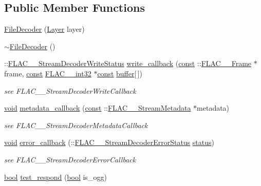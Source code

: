 \subsection*{Public Member Functions}
\begin{DoxyCompactItemize}
\item 
\hyperlink{class_file_decoder_af02f5afaac3171d70c7fc7ff48814525}{File\+Decoder} (\hyperlink{decoders_8c_a9a8118be7780e95363d631cbca7e7800}{Layer} layer)
\item 
\hyperlink{class_file_decoder_a9346b4780db3a0c08462a58651c34281}{$\sim$\+File\+Decoder} ()
\item 
\+::\hyperlink{group__flac__stream__decoder_ga73f67eb9e0ab57945afe038751bc62c8}{F\+L\+A\+C\+\_\+\+\_\+\+Stream\+Decoder\+Write\+Status} \hyperlink{class_file_decoder_a7ae15f00a3698dc421854bfd83cd51f4}{write\+\_\+callback} (\hyperlink{getopt1_8c_a2c212835823e3c54a8ab6d95c652660e}{const} \+::\hyperlink{struct_f_l_a_c_____frame}{F\+L\+A\+C\+\_\+\+\_\+\+Frame} $\ast$frame, \hyperlink{getopt1_8c_a2c212835823e3c54a8ab6d95c652660e}{const} \hyperlink{ordinals_8h_a33fd77bfe6d685541a0c034a75deccdc}{F\+L\+A\+C\+\_\+\+\_\+int32} $\ast$\hyperlink{getopt1_8c_a2c212835823e3c54a8ab6d95c652660e}{const} \hyperlink{structbuffer}{buffer}\mbox{[}$\,$\mbox{]})
\begin{DoxyCompactList}\small\item\em see F\+L\+A\+C\+\_\+\+\_\+\+Stream\+Decoder\+Write\+Callback \end{DoxyCompactList}\item 
\hyperlink{sound_8c_ae35f5844602719cf66324f4de2a658b3}{void} \hyperlink{class_file_decoder_ab89e50fac3c2214e4c8ed32166e14e8f}{metadata\+\_\+callback} (\hyperlink{getopt1_8c_a2c212835823e3c54a8ab6d95c652660e}{const} \+::\hyperlink{struct_f_l_a_c_____stream_metadata}{F\+L\+A\+C\+\_\+\+\_\+\+Stream\+Metadata} $\ast$metadata)
\begin{DoxyCompactList}\small\item\em see F\+L\+A\+C\+\_\+\+\_\+\+Stream\+Decoder\+Metadata\+Callback \end{DoxyCompactList}\item 
\hyperlink{sound_8c_ae35f5844602719cf66324f4de2a658b3}{void} \hyperlink{class_file_decoder_a965372af769fb2b7b06d9b928647b162}{error\+\_\+callback} (\+::\hyperlink{group__flac__stream__decoder_ga130e70bd9a73d3c2416247a3e5132ecf}{F\+L\+A\+C\+\_\+\+\_\+\+Stream\+Decoder\+Error\+Status} \hyperlink{rfft2d_test_m_l_8m_a1b5437a866e6f95107b07ba845bc1800}{status})
\begin{DoxyCompactList}\small\item\em see F\+L\+A\+C\+\_\+\+\_\+\+Stream\+Decoder\+Error\+Callback \end{DoxyCompactList}\item 
\hyperlink{mac_2config_2i386_2lib-src_2libsoxr_2soxr-config_8h_abb452686968e48b67397da5f97445f5b}{bool} \hyperlink{class_file_decoder_ae95d563fb845814477fcefe4e07bbba1}{test\+\_\+respond} (\hyperlink{mac_2config_2i386_2lib-src_2libsoxr_2soxr-config_8h_abb452686968e48b67397da5f97445f5b}{bool} is\+\_\+ogg)
\end{DoxyCompactItemize}
